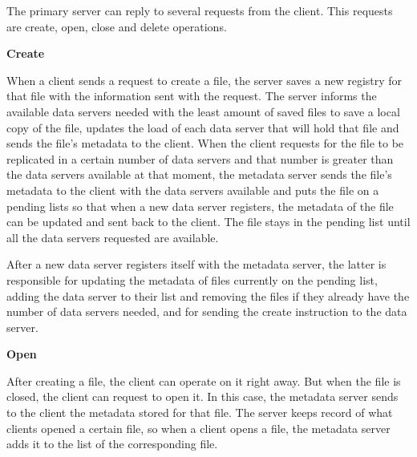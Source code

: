 The primary server can reply to several requests from the client. This
requests are create, open, close and delete operations.

\medskip
\textbf{Create}
\smallskip 

When a client sends a request to create a file, the server saves a new
registry for that file with the information sent with the request. The
server informs the available data servers needed with the least amount
of saved files to save a local copy of the file, updates the load
of each data server that will hold that file and sends the file's metadata
to the client. When the client requests for the file to be replicated in
a certain number of data servers and that number is greater than the 
data servers available at that moment, the metadata server sends the 
file's metadata to the client with the data servers available and puts the 
file on a pending lists so that when a new data server registers, the metadata 
of the file can be updated and sent back to the client. The file stays in the 
pending list until all the data servers requested are available.

After a new data server registers itself with the metadata server, the latter
is responsible for updating the metadata of files currently on the pending
list, adding the data server to their list and removing the files if they already
have the number of data servers needed, and for sending the create instruction
to the data server.


\bigskip
\textbf{Open}
\smallskip

After creating a file, the client can operate on it right away. But when
the file is closed, the client can request to open it. In this case, the
metadata server sends to the client the metadata stored for that file. The
server keeps record of what clients opened a certain file, so when a client
opens a file, the metadata server adds it to the list of the corresponding
file.

